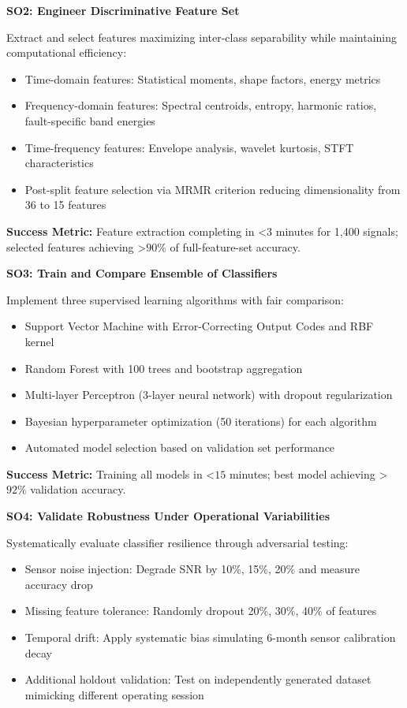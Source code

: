 \documentclass[11pt,a4paper]{article}
\begin{document}
\textbf{SO2: Engineer Discriminative Feature Set}

Extract and select features maximizing inter-class separability while maintaining computational efficiency:
\begin{itemize}[itemsep=0.2em]
    \item Time-domain features: Statistical moments, shape factors, energy metrics
    \item Frequency-domain features: Spectral centroids, entropy, harmonic ratios, fault-specific band energies
    \item Time-frequency features: Envelope analysis, wavelet kurtosis, STFT characteristics
    \item Post-split feature selection via MRMR criterion reducing dimensionality from 36 to 15 features
\end{itemize}

\textbf{Success Metric:} Feature extraction completing in $ $<$  3$ minutes for 1,400 signals; selected features achieving $ $>$  90\%$ of full-feature-set accuracy.

\textbf{SO3: Train and Compare Ensemble of Classifiers}

Implement three supervised learning algorithms with fair comparison:
\begin{itemize}[itemsep=0.2em]
    \item Support Vector Machine with Error-Correcting Output Codes and RBF kernel
    \item Random Forest with 100 trees and bootstrap aggregation
    \item Multi-layer Perceptron (3-layer neural network) with dropout regularization
    \item Bayesian hyperparameter optimization (50 iterations) for each algorithm
    \item Automated model selection based on validation set performance
\end{itemize}

\textbf{Success Metric:} Training all models in $ $<$  15$ minutes; best model achieving $ $>$  92\%$ validation accuracy.

\textbf{SO4: Validate Robustness Under Operational Variabilities}

Systematically evaluate classifier resilience through adversarial testing:
\begin{itemize}[itemsep=0.2em]
    \item Sensor noise injection: Degrade SNR by 10\%, 15\%, 20\% and measure accuracy drop
    \item Missing feature tolerance: Randomly dropout 20\%, 30\%, 40\% of features
    \item Temporal drift: Apply systematic bias simulating 6-month sensor calibration decay
    \item Additional holdout validation: Test on independently generated dataset mimicking different operating session
\end{itemize}
\end{document}
